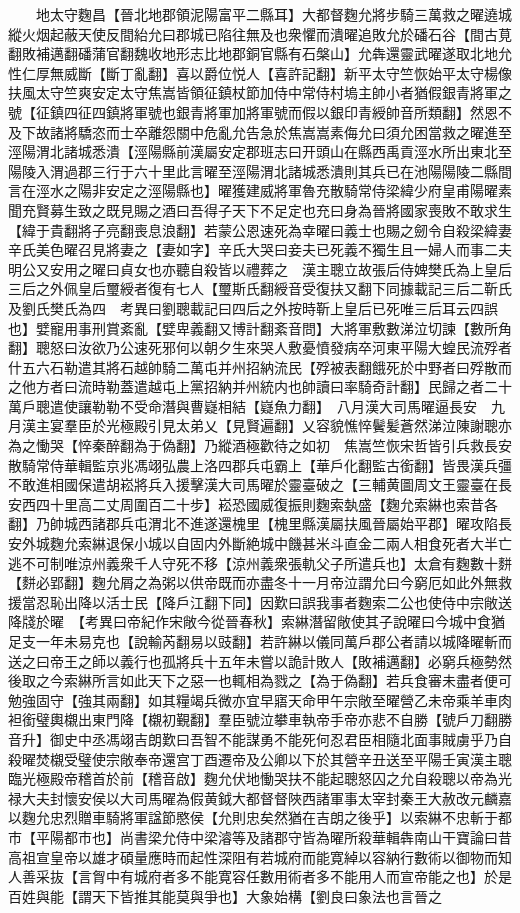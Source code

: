 　　地太守麴昌【晉北地郡領泥陽富平二縣耳】大都督麴允將步騎三萬救之曜遶城縱火烟起蔽天使反間紿允曰郡城已陷往無及也衆懼而潰曜追敗允於磻石谷【間古莧翻敗補邁翻磻蒲官翻魏收地形志比地郡銅官縣有石槃山】允犇還靈武曜遂取北地允性仁厚無威斷【斷丁亂翻】喜以爵位悦人【喜許記翻】新平太守竺恢始平太守楊像扶風太守竺爽安定太守焦嵩皆領征鎮杖節加侍中常侍村塢主帥小者猶假銀青將軍之號【征鎮四征四鎮將軍號也銀青將軍加將軍號而假以銀印青綬帥音所類翻】然恩不及下故諸將驕恣而士卒離怨關中危亂允告急於焦嵩嵩素侮允曰須允困當救之曜進至涇陽渭北諸城悉潰【涇陽縣前漢屬安定郡班志曰开頭山在縣西禹貢涇水所出東北至陽陵入渭過郡三行于六十里此言曜至涇陽渭北諸城悉潰則其兵已在池陽陽陵二縣間言在涇水之陽非安定之涇陽縣也】曜獲建威將軍魯充散騎常侍梁緯少府皇甫陽曜素聞充賢募生致之既見賜之酒曰吾得子天下不足定也充曰身為晉將國家喪敗不敢求生【緯于貴翻將子亮翻喪息浪翻】若蒙公恩速死為幸曜曰義士也賜之劒令自殺梁緯妻辛氏美色曜召見將妻之【妻如字】辛氏大哭曰妾夫已死義不獨生且一婦人而事二夫明公又安用之曜曰貞女也亦聽自殺皆以禮葬之　漢主聰立故張后侍婢樊氏為上皇后三后之外佩皇后璽綬者復有七人【璽斯氏翻綬音受復扶又翻下同據載記三后二靳氏及劉氏樊氏為四　考異曰劉聰載記曰四后之外按時靳上皇后已死唯三后耳云四誤也】嬖寵用事刑賞紊亂【嬖卑義翻又博計翻紊音問】大將軍敷數涕泣切諫【數所角翻】聰怒曰汝欲乃公速死邪何以朝夕生來哭人敷憂憤發病卒河東平陽大蝗民流殍者什五六石勒遣其將石越帥騎二萬屯并州招納流民【殍被表翻餓死於中野者曰殍散而之他方者曰流時勒蓋遣越屯上黨招納并州統内也帥讀曰率騎奇計翻】民歸之者二十萬戶聰遣使讓勒勒不受命潛與曹嶷相結【嶷魚力翻】　八月漢大司馬曜逼長安　九月漢主宴羣臣於光極殿引見太弟乂【見賢遍翻】乂容貌憔悴鬢髪蒼然涕泣陳謝聰亦為之慟哭【悴秦醉翻為于偽翻】乃縱酒極歡待之如初　焦嵩竺恢宋哲皆引兵救長安散騎常侍華輯監京兆馮翊弘農上洛四郡兵屯霸上【華戶化翻監古銜翻】皆畏漢兵彊不敢進相國保遣胡崧將兵入援擊漢大司馬曜於靈臺破之【三輔黄圖周文王靈臺在長安西四十里高二丈周圍百二十步】崧恐國威復振則麴索埶盛【麴允索綝也索昔各翻】乃帥城西諸郡兵屯渭北不進遂還槐里【槐里縣漢屬扶風晉屬始平郡】曜攻陷長安外城麴允索綝退保小城以自固内外斷絶城中饑甚米斗直金二兩人相食死者大半亡逃不可制唯涼州義衆千人守死不移【涼州義衆張軌父子所遣兵也】太倉有麴數十䴵【䴵必郢翻】麴允屑之為粥以供帝既而亦盡冬十一月帝泣謂允曰今窮厄如此外無救援當忍恥出降以活士民【降戶江翻下同】因歎曰誤我事者麴索二公也使侍中宗敞送降牋於曜　【考異曰帝紀作宋敞今從晉春秋】索綝潛留敞使其子說曜曰今城中食猶足支一年未易克也【說輸芮翻易以豉翻】若許綝以儀同萬戶郡公者請以城降曜斬而送之曰帝王之師以義行也孤將兵十五年未嘗以詭計敗人【敗補邁翻】必窮兵極勢然後取之今索綝所言如此天下之惡一也輒相為戮之【為于偽翻】若兵食審未盡者便可勉強固守【強其兩翻】如其糧竭兵微亦宜早寤天命甲午宗敞至曜營乙未帝乘羊車肉袒銜璧輿櫬出東門降【櫬初覲翻】羣臣號泣攀車執帝手帝亦悲不自勝【號戶刀翻勝音升】御史中丞馮翊吉朗歎曰吾智不能謀勇不能死何忍君臣相隨北面事賊虜乎乃自殺曜焚櫬受璧使宗敞奉帝還宫丁酉遷帝及公卿以下於其營辛丑送至平陽壬寅漢主聰臨光極殿帝稽首於前【稽音啟】麴允伏地慟哭扶不能起聰怒囚之允自殺聰以帝為光禄大夫封懷安侯以大司馬曜為假黄鉞大都督督陜西諸軍事太宰封秦王大赦改元麟嘉以麴允忠烈贈車騎將軍諡節愍侯【允則忠矣然猶在吉朗之後乎】以索綝不忠斬于都市【平陽都市也】尚書梁允侍中梁濬等及諸郡守皆為曜所殺華輯犇南山干寶論曰昔高祖宣皇帝以雄才碩量應時而起性深阻有若城府而能寛綽以容納行數術以御物而知人善采抜【言胷中有城府者多不能寛容任數用術者多不能用人而宣帝能之也】於是百姓與能【謂天下皆推其能莫與爭也】大象始構【劉良曰象法也言晉之